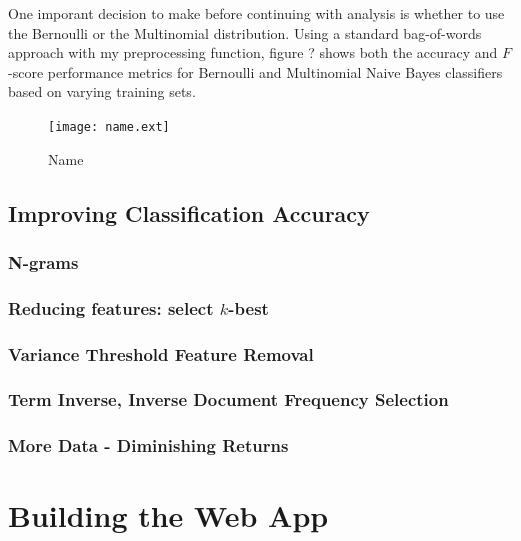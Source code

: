 \documentclass[letter,12pt]{article}
\begin{document}
One imporant decision to make before continuing with analysis is whether to use
the Bernoulli or the Multinomial distribution. Using a standard bag-of-words
approach with my preprocessing function, figure ? shows both the accuracy and
$F$-score performance metrics for Bernoulli and Multinomial Naive Bayes
classifiers based on varying training sets.

\begin{figure}[h]
  \centering
  \texttt{[image: name.ext]}
  \caption{Name}
  \label{fig:name}
\end{figure}

\subsection{Improving Classification Accuracy}

\subsubsection{N-grams}
\label{ssub:n_grams}

\subsubsection{Reducing features: select $k$-best}
\label{ssub:reducing_features_select_k_best}


\subsubsection{Variance Threshold Feature Removal}
\label{ssub:variance_threshold_feature_removal}


\subsubsection{Term Inverse, Inverse Document Frequency Selection}
\label{ssub:term_inverse_inverse_document_frequency_selection}


\subsubsection{More Data - Diminishing Returns}
\label{ssub:more_data}


\section{Building the Web App}
\label{sec:web}
\end{document}
